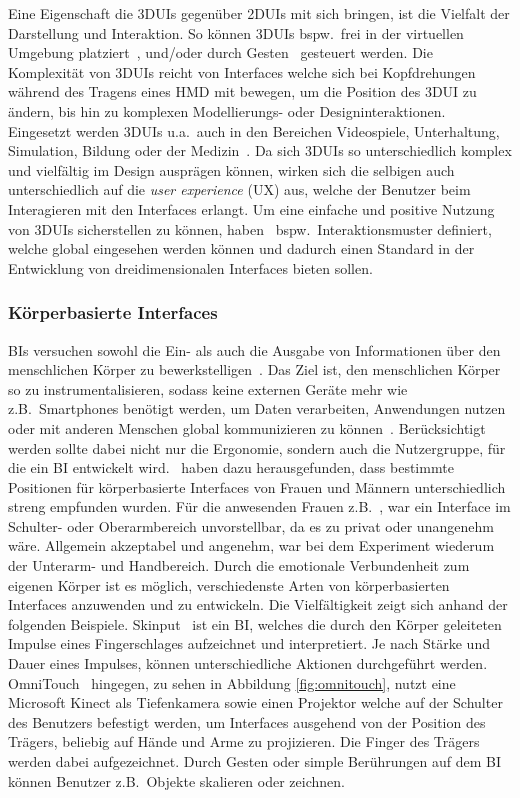 \noindent Eine Eigenschaft die 3DUIs gegenüber 2DUIs mit sich bringen, ist die Vielfalt der Darstellung und Interaktion. So können 3DUIs bspw.~frei in der virtuellen Umgebung platziert~\cite{anintroductionto3dspacial}, und/oder durch Gesten~\cite{introduction3dgesturalinterfaces} gesteuert werden. Die Komplexität von 3DUIs reicht von Interfaces welche sich bei Kopfdrehungen während des Tragens eines HMD mit bewegen, um die Position des 3DUI zu ändern, bis hin zu komplexen Modellierungs- oder Designinteraktionen. Eingesetzt werden 3DUIs u.a.~auch in den Bereichen Videospiele, Unterhaltung, Simulation, Bildung oder der Medizin~\cite{theoryandpracticebook}. Da sich 3DUIs so unterschiedlich komplex und vielfältig im Design ausprägen können, wirken sich die selbigen auch unterschiedlich auf die \textit{user experience} (UX) aus, welche der Benutzer beim Interagieren mit den Interfaces erlangt. Um eine einfache und positive Nutzung von 3DUIs sicherstellen zu können, haben~\cite{interactionpatterns} bspw.~Interaktionsmuster definiert, welche global eingesehen werden können und dadurch einen Standard in der Entwicklung von dreidimensionalen Interfaces bieten sollen.

\subsubsection{Körperbasierte Interfaces}
BIs versuchen sowohl die Ein- als auch die Ausgabe von Informationen über den menschlichen Körper zu bewerkstelligen~\cite{implicationsoflocation}. Das Ziel ist, den menschlichen Körper so zu instrumentalisieren, sodass keine externen Geräte mehr wie z.B.~Smartphones benötigt werden, um Daten verarbeiten, Anwendungen nutzen oder mit anderen Menschen global kommunizieren zu können~\cite{skinput}. Berücksichtigt werden sollte dabei nicht nur die Ergonomie, sondern auch die Nutzergruppe, für die ein BI entwickelt wird.~\cite{implicationsoflocation} haben dazu herausgefunden, dass bestimmte Positionen für körperbasierte Interfaces von Frauen und Männern unterschiedlich streng empfunden wurden. Für die anwesenden Frauen z.B.~, war ein Interface im Schulter- oder Oberarmbereich unvorstellbar, da es zu privat oder unangenehm wäre. Allgemein akzeptabel und angenehm, war bei dem Experiment wiederum der Unterarm- und Handbereich. Durch die emotionale Verbundenheit zum eigenen Körper ist es möglich, verschiedenste Arten von körperbasierten Interfaces anzuwenden und zu entwickeln. Die Vielfältigkeit zeigt sich anhand der folgenden Beispiele. Skinput~\cite{skinput} ist ein BI, welches die durch den Körper geleiteten Impulse eines Fingerschlages aufzeichnet und interpretiert. Je nach Stärke und Dauer eines Impulses, können unterschiedliche Aktionen durchgeführt werden. OmniTouch~\cite{omnitouch} hingegen, zu sehen in Abbildung \ref{fig:omnitouch}, nutzt eine Microsoft Kinect als Tiefenkamera sowie einen Projektor welche auf der Schulter des Benutzers befestigt werden, um Interfaces ausgehend von der Position des Trägers, beliebig auf Hände und Arme zu projizieren. Die Finger des Trägers werden dabei aufgezeichnet. Durch Gesten oder simple Berührungen auf dem BI können Benutzer z.B.~Objekte skalieren oder zeichnen.\\

